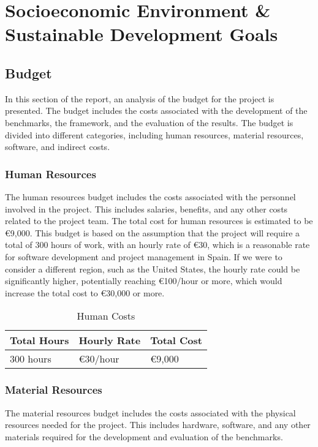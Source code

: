 \chapter{Socioeconomic Environment \& Sustainable Development Goals}\label{chap:economic-env}

\section{Budget}
In this section of the report, an analysis of the budget for the project is presented. The budget includes the costs associated with the development of the benchmarks, the framework, and the evaluation of the results. The budget is divided into different categories, including human resources, material resources, software, and indirect costs.

\subsection{Human Resources}
The human resources budget includes the costs associated with the personnel involved in the project. This includes salaries, benefits, and any other costs related to the project team. The total cost for human resources is estimated to be €9,000. This budget is based on the assumption that the project will require a total of 300 hours of work, with an hourly rate of €30, which is a reasonable rate for software development and project management in Spain. If we were to consider a different region, such as the United States, the hourly rate could be significantly higher, potentially reaching €100/hour or more, which would increase the total cost to €30,000 or more.

\begin{table}[h]
  \centering
  \begin{tabular}{lll}
    \textbf{Total Hours} & \textbf{Hourly Rate} & \textbf{Total Cost} \\
    \hline
    300 hours & €30/hour & €9,000 \\
  \end{tabular}
  \caption{Human Costs}
  \label{tab:human-resources}
\end{table}

\subsection{Material Resources}
The material resources budget includes the costs associated with the physical resources needed for the project. This includes hardware, software, and any other materials required for the development and evaluation of the benchmarks.


